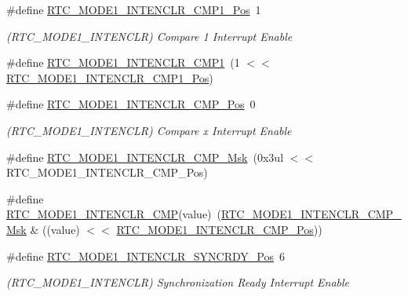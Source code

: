 \begin{DoxyCompactItemize}
\item 
\#define \mbox{\hyperlink{group___s_a_m_d21___r_t_c_ga57240eb2e86afb12d85412cdf775876a}{R\+T\+C\+\_\+\+M\+O\+D\+E1\+\_\+\+I\+N\+T\+E\+N\+C\+L\+R\+\_\+\+C\+M\+P1\+\_\+\+Pos}}~1
\begin{DoxyCompactList}\small\item\em (R\+T\+C\+\_\+\+M\+O\+D\+E1\+\_\+\+I\+N\+T\+E\+N\+C\+LR) Compare 1 Interrupt Enable \end{DoxyCompactList}\item 
\#define \mbox{\hyperlink{group___s_a_m_d21___r_t_c_gac86fdadc0f7aa1633d8815aa8e5d3df3}{R\+T\+C\+\_\+\+M\+O\+D\+E1\+\_\+\+I\+N\+T\+E\+N\+C\+L\+R\+\_\+\+C\+M\+P1}}~(1 $<$$<$ \mbox{\hyperlink{group___s_a_m_d21___r_t_c_ga57240eb2e86afb12d85412cdf775876a}{R\+T\+C\+\_\+\+M\+O\+D\+E1\+\_\+\+I\+N\+T\+E\+N\+C\+L\+R\+\_\+\+C\+M\+P1\+\_\+\+Pos}})
\item 
\#define \mbox{\hyperlink{group___s_a_m_d21___r_t_c_ga5573547a4b7970bba49213f6f8f191b3}{R\+T\+C\+\_\+\+M\+O\+D\+E1\+\_\+\+I\+N\+T\+E\+N\+C\+L\+R\+\_\+\+C\+M\+P\+\_\+\+Pos}}~0
\begin{DoxyCompactList}\small\item\em (R\+T\+C\+\_\+\+M\+O\+D\+E1\+\_\+\+I\+N\+T\+E\+N\+C\+LR) Compare x Interrupt Enable \end{DoxyCompactList}\item 
\#define \mbox{\hyperlink{group___s_a_m_d21___r_t_c_ga18c87df5459027d90dc58ce0e6588926}{R\+T\+C\+\_\+\+M\+O\+D\+E1\+\_\+\+I\+N\+T\+E\+N\+C\+L\+R\+\_\+\+C\+M\+P\+\_\+\+Msk}}~(0x3ul $<$$<$ R\+T\+C\+\_\+\+M\+O\+D\+E1\+\_\+\+I\+N\+T\+E\+N\+C\+L\+R\+\_\+\+C\+M\+P\+\_\+\+Pos)
\item 
\#define \mbox{\hyperlink{group___s_a_m_d21___r_t_c_gab27c4c5b97cc71392e38b3737d21932a}{R\+T\+C\+\_\+\+M\+O\+D\+E1\+\_\+\+I\+N\+T\+E\+N\+C\+L\+R\+\_\+\+C\+MP}}(value)~(\mbox{\hyperlink{group___s_a_m_d21___r_t_c_ga18c87df5459027d90dc58ce0e6588926}{R\+T\+C\+\_\+\+M\+O\+D\+E1\+\_\+\+I\+N\+T\+E\+N\+C\+L\+R\+\_\+\+C\+M\+P\+\_\+\+Msk}} \& ((value) $<$$<$ \mbox{\hyperlink{group___s_a_m_d21___r_t_c_ga5573547a4b7970bba49213f6f8f191b3}{R\+T\+C\+\_\+\+M\+O\+D\+E1\+\_\+\+I\+N\+T\+E\+N\+C\+L\+R\+\_\+\+C\+M\+P\+\_\+\+Pos}}))
\item 
\#define \mbox{\hyperlink{group___s_a_m_d21___r_t_c_ga2b8ebe737235c5f6d1d6f81f512ac72b}{R\+T\+C\+\_\+\+M\+O\+D\+E1\+\_\+\+I\+N\+T\+E\+N\+C\+L\+R\+\_\+\+S\+Y\+N\+C\+R\+D\+Y\+\_\+\+Pos}}~6
\begin{DoxyCompactList}\small\item\em (R\+T\+C\+\_\+\+M\+O\+D\+E1\+\_\+\+I\+N\+T\+E\+N\+C\+LR) Synchronization Ready Interrupt Enable \end{DoxyCompactList}\item 
$$
\end{DoxyCompactItemize}
